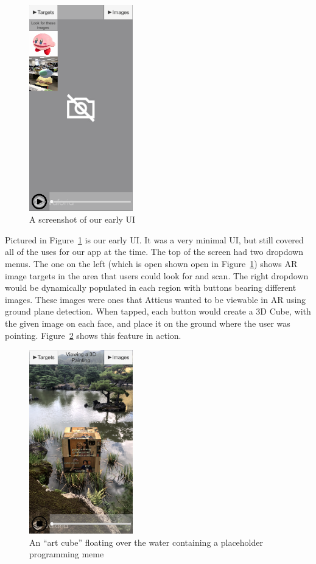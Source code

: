 \documentclass[a4paper, 10pt, american, titlepage]{article}
\begin{document}
\begin{figure}[h]
	\centering
	\includegraphics[width=0.4\textwidth]{old-ui.png}
	\caption{A screenshot of our early UI}
	\label{fig:oldUI}
\end{figure}

Pictured in Figure~\ref{fig:oldUI} is our early UI. It was a very minimal UI,
but still covered all of the uses for our app at the time. The top of the screen
had two dropdown menus. The one on the left (which is open shown open in
Figure~\ref{fig:oldUI}) shows AR image targets in the area that users could
look for and scan. The right dropdown would be dynamically populated in each
region with buttons bearing different images. These images were ones that
Atticus wanted to be viewable in AR using ground plane detection. When tapped,
each button would create a 3D Cube, with the given image on each face, and place
it on the ground where the user was pointing. Figure~\ref{fig:floatingCube}
shows this feature in action.

\begin{figure}[h]
	\centering
	\includegraphics[width=0.4\textwidth]{floating-cube.png}
	\caption{An ``art cube'' floating over the water containing a placeholder
    programming meme}
	\label{fig:floatingCube}
\end{figure}
\end{document}
